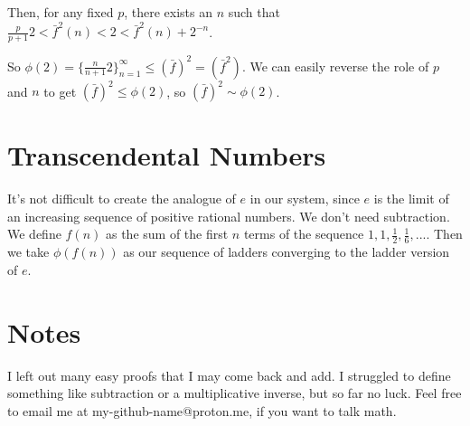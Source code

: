 \documentclass{article}
\renewcommand{\l}[1]{( #1 ) }
\begin{document}
\begin{huge}
Then, for any fixed $p$, there exists an $n$ such that $\frac{p}{p+1}2 < \bar f ^ 2 (n) < 2 < \bar f ^ 2 (n) + 2^{-n}$. 

So $\phi(2) = \{\frac{n}{n+1}2\}_{n=1}^{\infty} \le \l{\bar f}^2 = \l{\bar f ^2}.$ We can easily reverse the role of $p$ and $n$ to get $\l{\bar f}^2 \le \phi(2)$, so  $\l{\bar f}^2 \sim \phi(2)$.

\section{Transcendental Numbers}

It's not difficult to create the analogue of $e$ in our system, since $e$ is the limit of an increasing sequence of positive rational numbers. We don't need subtraction. We define $f(n)$ as the sum of the first $n$ terms of the sequence $1,1,\frac{1}{2}, \frac{1}{6}, ...$. Then we take $\phi(f(n))$ as our sequence of ladders converging to the ladder version of $e$.

\section{Notes}
I left out many easy proofs that I may come back and add. I struggled to define something like subtraction or a multiplicative inverse, but so far no luck. Feel free to email me at my-github-name@proton.me, if you want to talk math.

\end{huge}
\end{document}
